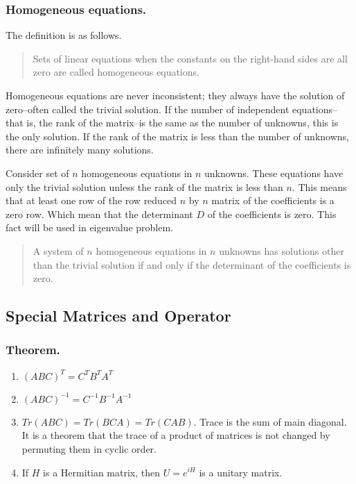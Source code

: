 \documentclass[../main.tex]{subfiles}
\begin{document}
\subsubsection*{Homogeneous equations.} The definition is as follows.

\begin{quote}
	Sets of linear equations when the constants on the right-hand sides are all zero are called homogeneous equations.
\end{quote}

Homogeneous equations are never inconsistent; they always have the solution of zero--often called the trivial solution.
If the number of independent equations--that is, the rank of the matrix--is the same as the number of unknowns, this is the only solution.
If the rank of the matrix is less than the number of unknowns, there are infinitely many solutions.

Consider set of $n$ homogeneous equations in $n$ unknowns.
These equations have only the trivial solution unless the rank of the matrix is less than $n$.
This means that at least one row of the row reduced $n$ by $n$ matrix of the coefficients is a zero row.
Which mean that the determinant $D$ of the coefficients is zero.
This fact will be used in eigenvalue problem.

\begin{quote}
	A system of $n$ homogeneous equations in $n$ unknowns has solutions other than the trivial solution if and only if the determinant of the coefficients is zero.
\end{quote}

\subsection*{Special Matrices and Operator}
\subsubsection*{Theorem.}
\begin{enumerate}
	\item $(ABC)^T=C^TB^TA^T$
	\item $(ABC)^{-1}=C^{-1}B^{-1}A^{-1}$
	\item $Tr(ABC)=Tr(BCA)=Tr(CAB)$.  Trace is the sum of main diagonal. It is a theorem that the
	      trace of a product of matrices is not changed by permuting them in cyclic order.
	\item If $H$ is a Hermitian matrix, then $U = e^{iH}$ is a unitary matrix.
\end{enumerate}
\end{document}
